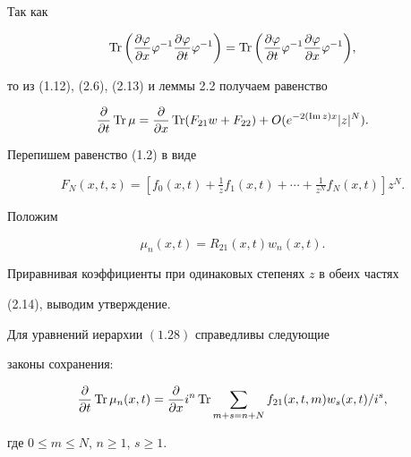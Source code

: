 \begin{pf}
Так как 


$$ 


\Tr\bigg(\myfrac{\varphi}{x}\varphi^{-1} 


\myfrac{\varphi}{t}\varphi^{-1}\bigg)=\Tr\bigg( 


\myfrac{\varphi}{t}\varphi^{-1} 


\myfrac{\varphi}{x}\varphi^{-1}\bigg), 


$$ 


то из (1.12), (2.6), (2.13) и леммы 2.2 получаем равенство 


\begin{equation} 


\myfrac{}{t}\Tr\mu=\myfrac{}{x}\Tr(F_{21}w+F_{22})+ 


O(e^{-2(\im z)x}|z|^N). 


\end{equation} 


 


Перепишем равенство (1.2) в виде 


$$ 


F_N(x,t,z)=[f_0(x,t)+\tfrac{1}{z}f_1(x,t)+\dotsb+ 


\tfrac{1}{z^N}f_N(x,t)]z^N. 


$$ 


Положим 


\begin{equation} 


\mu_n(x,t)=R_{21}(x,t)w_n(x,t). 


\end{equation} 


Приравнивая коэффициенты при одинаковых степенях $z$ в обеих частях 


(2.14), выводим утверждение. 


\end{pf} 


 


\begin{thms} Для уравнений иерархии $(1.28)$ справедливы следующие 


законы сохранения$:$ 


\begin{equation} 


\myfrac{}{t}\Tr\mu_n(x,t)=\myfrac{}{x}i^n\Tr 


\sum_{m+s=n+N}f_{21}(x,t,m)w_s(x,t)/i^s, 


\end{equation} 


где $0\le m\le N$, $n\ge 1$, $s\ge 1$. 


\end{thms} 


